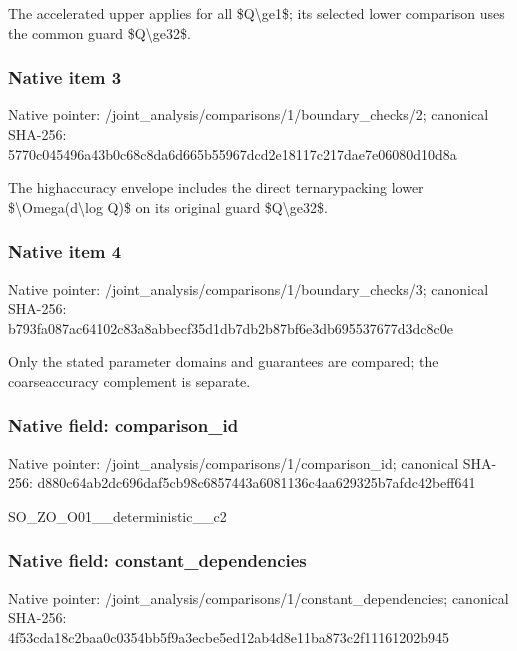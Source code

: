 \documentclass[10pt,a4paper]{article}
\begin{document}
The accelerated upper applies for all \$Q\textbackslash{}ge1\$; its selected lower comparison uses the common guard \$Q\textbackslash{}ge32\$.


\subsubsection{Native item 3}


Native pointer: /joint\_analysis/comparis\allowbreak{}ons/1/boundary\_checks/2; canonical SHA-256: 5770c045496a43b0c68c8da6\allowbreak{}d665b55967dcd2e18117c217\allowbreak{}dae7e06080d10d8a


The highaccuracy envelope includes the direct ternarypacking lower \$\textbackslash{}Omega(d\textbackslash{}log Q)\$ on its original guard \$Q\textbackslash{}ge32\$.


\subsubsection{Native item 4}


Native pointer: /joint\_analysis/comparis\allowbreak{}ons/1/boundary\_checks/3; canonical SHA-256: b793fa087ac64102c83a8abb\allowbreak{}ecf35d1db7db2b87bf6e3db6\allowbreak{}95537677d3dc8c0e


Only the stated parameter domains and guarantees are compared; the coarseaccuracy complement is separate.


\subsubsection{Native field: comparison\_id}


Native pointer: /joint\_analysis/comparis\allowbreak{}ons/1/comparison\_id; canonical SHA-256: d880c64ab2dc696daf5cb98c\allowbreak{}6857443a6081136c4aa62932\allowbreak{}5b7afdc42beff641


SO\_ZO\_O01\_\_deterministic\_\_c2


\subsubsection{Native field: constant\_dependencies}


Native pointer: /joint\_analysis/comparis\allowbreak{}ons/1/constant\_dependenc\allowbreak{}ies; canonical SHA-256: 4f53cda18c2baa0c0354bb5f\allowbreak{}9a3ecbe5ed12ab4d8e11ba87\allowbreak{}3c2f11161202b945
\end{document}
